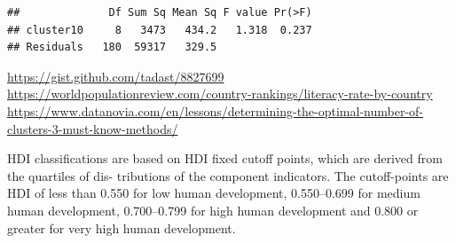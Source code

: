 \documentclass[]{article}
\newenvironment{Shaded}{\begin{snugshade}}{\end{snugshade}}
\newcommand{\CommentTok}[1]{\textcolor[rgb]{0.56,0.35,0.01}{\textit{#1}}}
\newcommand{\DataTypeTok}[1]{\textcolor[rgb]{0.13,0.29,0.53}{#1}}
\newcommand{\DecValTok}[1]{\textcolor[rgb]{0.00,0.00,0.81}{#1}}
\newcommand{\KeywordTok}[1]{\textcolor[rgb]{0.13,0.29,0.53}{\textbf{#1}}}
\newcommand{\NormalTok}[1]{#1}
\newcommand{\OperatorTok}[1]{\textcolor[rgb]{0.81,0.36,0.00}{\textbf{#1}}}
\newcommand{\StringTok}[1]{\textcolor[rgb]{0.31,0.60,0.02}{#1}}
\begin{document}
\begin{verbatim}
##              Df Sum Sq Mean Sq F value Pr(>F)
## cluster10     8   3473   434.2   1.318  0.237
## Residuals   180  59317   329.5
\end{verbatim}

\url{https://gist.github.com/tadast/8827699}
\url{https://worldpopulationreview.com/country-rankings/literacy-rate-by-country}
\url{https://www.datanovia.com/en/lessons/determining-the-optimal-number-of-clusters-3-must-know-methods/}

\begin{Shaded}
\end{Shaded}

HDI classifications are based on HDI fixed cutoff points, which are
derived from the quartiles of dis- tributions of the component
indicators. The cutoff-points are HDI of less than 0.550 for low human
development, 0.550--0.699 for medium human development, 0.700--0.799 for
high human development and 0.800 or greater for very high human
development.
\end{document}
